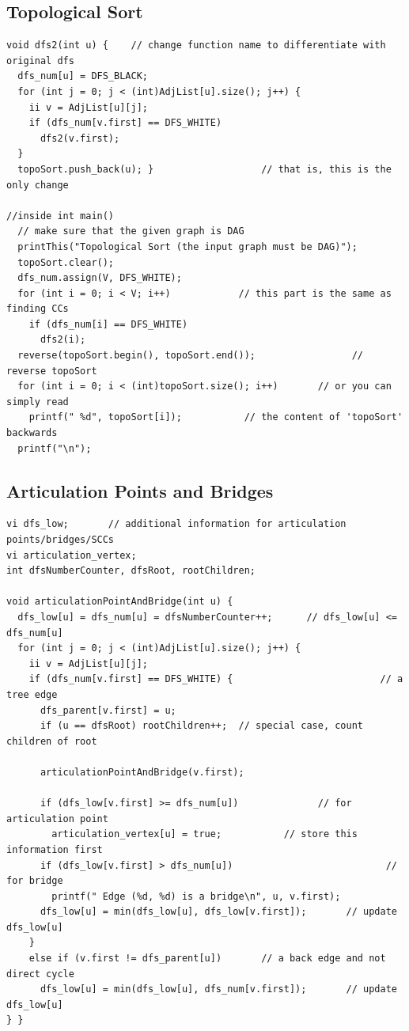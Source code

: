 \documentclass[10pt,landscape]{article}
\begin{document}
\begin{multicols}{2}
\subsection{Topological Sort}
\begin{lstlisting}
void dfs2(int u) {    // change function name to differentiate with original dfs
  dfs_num[u] = DFS_BLACK;
  for (int j = 0; j < (int)AdjList[u].size(); j++) {
    ii v = AdjList[u][j];
    if (dfs_num[v.first] == DFS_WHITE)
      dfs2(v.first);
  }
  topoSort.push_back(u); }                   // that is, this is the only change

//inside int main()
  // make sure that the given graph is DAG
  printThis("Topological Sort (the input graph must be DAG)");
  topoSort.clear();
  dfs_num.assign(V, DFS_WHITE);
  for (int i = 0; i < V; i++)            // this part is the same as finding CCs
    if (dfs_num[i] == DFS_WHITE)
      dfs2(i);
  reverse(topoSort.begin(), topoSort.end());                 // reverse topoSort
  for (int i = 0; i < (int)topoSort.size(); i++)       // or you can simply read
    printf(" %d", topoSort[i]);           // the content of 'topoSort' backwards
  printf("\n");
\end{lstlisting}

\subsection{Articulation Points and Bridges}
\begin{lstlisting}
vi dfs_low;       // additional information for articulation points/bridges/SCCs
vi articulation_vertex;
int dfsNumberCounter, dfsRoot, rootChildren;

void articulationPointAndBridge(int u) {
  dfs_low[u] = dfs_num[u] = dfsNumberCounter++;      // dfs_low[u] <= dfs_num[u]
  for (int j = 0; j < (int)AdjList[u].size(); j++) {
    ii v = AdjList[u][j];
    if (dfs_num[v.first] == DFS_WHITE) {                          // a tree edge
      dfs_parent[v.first] = u;
      if (u == dfsRoot) rootChildren++;  // special case, count children of root

      articulationPointAndBridge(v.first);

      if (dfs_low[v.first] >= dfs_num[u])              // for articulation point
        articulation_vertex[u] = true;           // store this information first
      if (dfs_low[v.first] > dfs_num[u])                           // for bridge
        printf(" Edge (%d, %d) is a bridge\n", u, v.first);
      dfs_low[u] = min(dfs_low[u], dfs_low[v.first]);       // update dfs_low[u]
    }
    else if (v.first != dfs_parent[u])       // a back edge and not direct cycle
      dfs_low[u] = min(dfs_low[u], dfs_num[v.first]);       // update dfs_low[u]
} }


\end{lstlisting}
\end{multicols}
\end{document}
